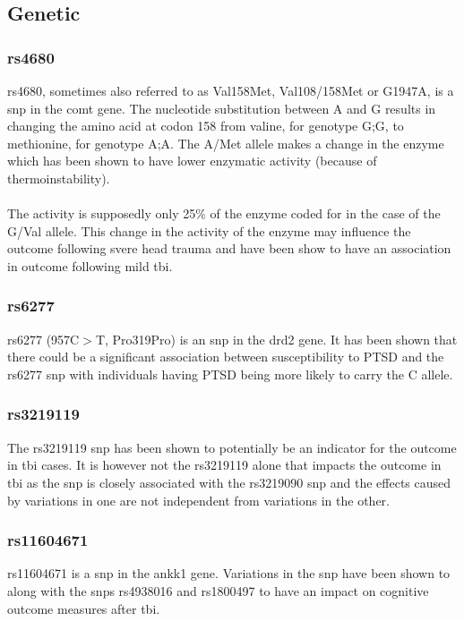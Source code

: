 \documentclass[11pt]{article}
\begin{document}
\subsection{Genetic}

\subsubsection{rs4680}
rs4680, sometimes also referred to as Val158Met, Val108/158Met or G1947A, is a \gls{snp} in the \gls{comt} gene. The nucleotide substitution between A and G results in changing the amino acid at codon 158 from valine, for genotype G;G, to methionine, for genotype A;A. The A/Met allele makes a change in the enzyme which has been shown to have lower enzymatic activity (because of thermoinstability).\cite{Rs46802020}\\
\\
The activity is supposedly only 25\% of the enzyme coded for in the case of the G/Val allele\cite{Rs4680SNPedia}. This change in the activity of the enzyme may influence the outcome following svere head trauma and have been show to have an association in outcome following mild \gls{tbi}.\cite{winklerCOMTVal1582016}

\subsubsection{rs6277}
rs6277 (957C$>$T, Pro319Pro) is an \gls{snp} in the \gls{drd2} gene\cite{Rs6277SNPedia}. It has been shown that there could be a significant association between susceptibility to PTSD and the rs6277 \gls{snp} with individuals having PTSD being more likely to carry the C allele\cite{voiseyDRD2Gene957C2009}.
\subsubsection{rs3219119}
The rs3219119 \gls{snp} has been shown to potentially be an indicator for the outcome in \gls{tbi} cases. It is however not the rs3219119 alone that impacts the outcome in \gls{tbi} as the \gls{snp} is closely associated with the rs3219090 \gls{snp} and the effects caused by variations in one are not independent from variations in the other.\cite{sarnaikInfluencePARP1Polymorphisms2010}

\subsubsection{rs11604671}
rs11604671 is a \gls{snp} in the \gls{ankk1} gene\cite{Rs11604671SNPedia}. Variations in the \gls{snp} have been shown to along with the \glspl{snp} rs4938016 and rs1800497 to have an impact on cognitive outcome measures after \gls{tbi}.\cite{mcallisterSingleNucleotidePolymorphisms2008a}
\end{document}
